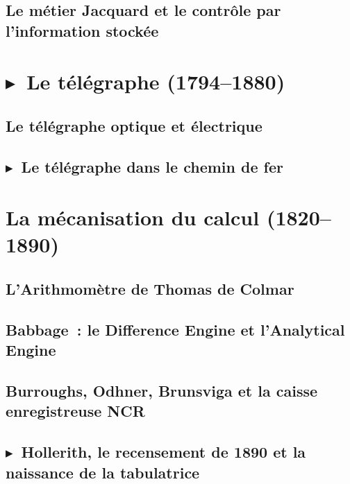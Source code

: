 \subsection{Le métier Jacquard et le contrôle par l'information stockée}\label{subsec:jacquard}


\section{$\blacktriangleright$~Le télégraphe (1794--1880)}\label{sec:telegraph}

\subsection{Le télégraphe optique et électrique}\label{subsec:telegraph}

\subsection{$\blacktriangleright$~Le télégraphe dans le chemin de fer}\label{subsec:railroad}


\section{La mécanisation du calcul (1820--1890)}\label{sec:calculating}

\subsection{L'Arithmomètre de Thomas de Colmar}\label{subsec:arithmometre}

\subsection{Babbage~: le Difference Engine et l'Analytical Engine}\label{subsec:babbage}

\subsection{Burroughs, Odhner, Brunsviga et la caisse enregistreuse NCR}\label{subsec:burroughs}

\subsection{$\blacktriangleright$~Hollerith, le recensement de 1890 et la naissance de la tabulatrice}\label{subsec:hollerith}


